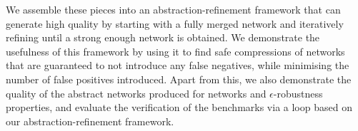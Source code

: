 We assemble these pieces into an abstraction-refinement framework that can
generate high quality \abs by starting with a fully merged network and
iteratively refining until a strong enough network is obtained. We demonstrate
the usefulness of this framework by using it to find safe compressions of \mnist
networks that are guaranteed to not introduce any false negatives, while
minimising the number of false positives introduced. Apart from this, we also
demonstrate the quality of the abstract networks produced for \mnist networks
and $\epsilon$-robustness properties, and evaluate the verification of the
\acasxu benchmarks via a \cegar loop based on our abstraction-refinement
framework.
